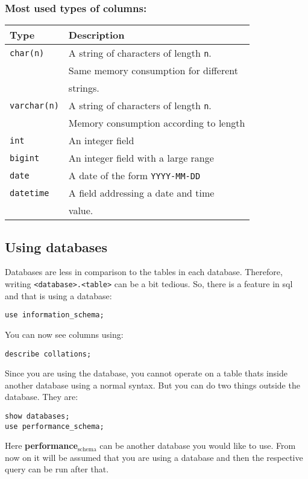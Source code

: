 \documentclass[11pt]{article}
\begin{document}
\subsubsection{Most used types of columns:}
\label{sec:orgheadline7}
\begin{center}
\begin{tabular}{ll}
Type & Description\\
\hline
\texttt{char(n)} & A string of characters of length \texttt{n}.\\
 & Same memory consumption for different\\
 & strings.\\
\texttt{varchar(n)} & A string of characters of length \texttt{n}.\\
 & Memory consumption according to length\\
\texttt{int} & An integer field\\
\texttt{bigint} & An integer field with a large range\\
\texttt{date} & A date of the form \texttt{YYYY-MM-DD}\\
\texttt{datetime} & A field addressing a date and time\\
 & value.\\
\end{tabular}
\end{center}
\subsection{Using databases}
\label{sec:orgheadline5}
Databases are less in comparison to the tables in
each database. Therefore, writing \texttt{<database>.<table>}
can be a bit tedious. So, there is a feature in sql
and that is using a database:
\begin{verbatim}
use information_schema;
\end{verbatim}
You can now see columns using:
\begin{verbatim}
describe collations;
\end{verbatim}
Since you are using the database, you cannot operate
on a table thats inside another database using a normal
syntax.
But you can do two things outside the database. 
They are:
\begin{verbatim}
show databases;
use performance_schema;
\end{verbatim}
Here \textbf{performance\(_{\text{schema}}\)} can be another database you
would like to use.
From now on it will be assumed that you are using a
database and then the respective query can be run after
that.
\end{document}
